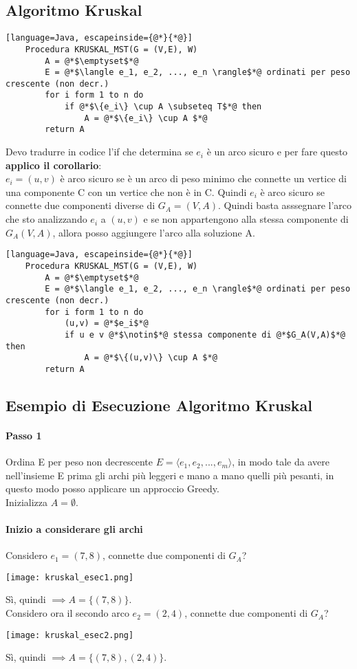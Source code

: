 \subsection{Algoritmo Kruskal}
\begin{lstlisting}[language=Java, escapeinside={@*}{*@}]
    Procedura KRUSKAL_MST(G = (V,E), W)
        A = @*$\emptyset$*@
        E = @*$\langle e_1, e_2, ..., e_n \rangle$*@ ordinati per peso crescente (non decr.)
        for i form 1 to n do
            if @*$\{e_i\} \cup A \subseteq T$*@ then
                A = @*$\{e_i\} \cup A $*@
        return A
\end{lstlisting}
Devo tradurre in codice l'if che determina se $e_i$ è un arco sicuro e per fare questo
\textbf{applico il corollario}:\\
$e_i = (u,v)$ è arco sicuro se è un arco di peso minimo che connette un vertice di una componente C
con un vertice che non è in C. Quindi $e_i$ è arco sicuro se connette due componenti diverse
di $G_A = (V,A)$. Quindi basta asssegnare l'arco che sto analizzando $e_i$ a $(u,v)$ e se
non appartengono alla stessa componente di $G_A(V,A)$, allora posso aggiungere l'arco alla soluzione A.
\begin{lstlisting}[language=Java, escapeinside={@*}{*@}]
    Procedura KRUSKAL_MST(G = (V,E), W)
        A = @*$\emptyset$*@
        E = @*$\langle e_1, e_2, ..., e_n \rangle$*@ ordinati per peso crescente (non decr.)
        for i form 1 to n do
            (u,v) = @*$e_i$*@
            if u e v @*$\notin$*@ stessa componente di @*$G_A(V,A)$*@ then
                A = @*$\{(u,v)\} \cup A $*@
        return A
\end{lstlisting}
\subsection{Esempio di Esecuzione Algoritmo Kruskal}
\paragraph*{Passo 1} Ordina E per peso non decrescente \ra $E=\langle e_1, e_2, ..., e_m\rangle$,
in modo tale da avere nell'insieme E prima gli archi più leggeri e mano a mano quelli più
pesanti, in questo modo posso applicare un approccio Greedy.\\
Inizializza $A = \emptyset$.\\
\paragraph*{Inizio a considerare gli archi} Considero $e_1 = (7,8)$, connette due componenti di
$G_A$?
\begin{center}
    \texttt{[image: kruskal\_esec1.png]}
\end{center}
Sì, quindi $\implies A = \{(7,8)\}$.\\
Considero ora il secondo arco $e_2 = (2,4)$, connette due componenti di $G_A$?
\begin{center}
    \texttt{[image: kruskal\_esec2.png]}
\end{center}
Sì, quindi $\implies A = \{(7,8), (2,4)\}$.\\
